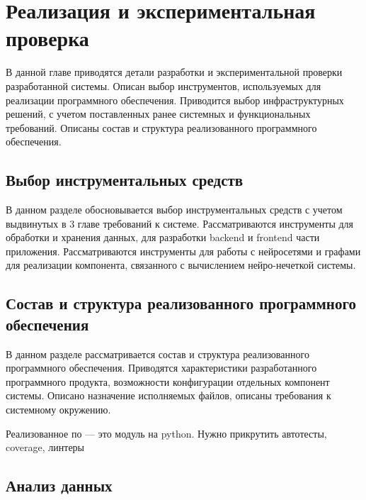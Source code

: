 \chapter{Реализация и экспериментальная проверка}

\begin{annotation}
	В данной главе приводятся детали разработки и экспериментальной проверки
	разработанной системы. Описан выбор инструментов, используемых для реализации
	программного обеспечения. Приводится выбор инфраструктурных решений,
	с учетом поставленных ранее системных и функциональных требований.
	Описаны состав и структура реализованного программного обеспечения.
\end{annotation}




\section{Выбор инструментальных средств}
\begin{annotation}
	В данном разделе обосновывается выбор инструментальных средств с учетом выдвинутых в 3
	главе требований к системе. Рассматриваются инструменты для обработки и хранения данных,
	для разработки backend и frontend части приложения. Рассматриваются инструменты для работы
	с нейросетями и графами для реализации компонента, связанного с вычислением нейро-нечеткой системы.
\end{annotation}



\section{Состав и структура реализованного программного обеспечения}
\begin{annotation}
	В данном разделе рассматривается состав и структура реализованного программного обеспечения.
	Приводятся характеристики разработанного программного продукта, возможности конфигурации отдельных
	компонент системы. Описано назначение исполняемых файлов, описаны требования к системному окружению.
\end{annotation}

Реализованное по --- это модуль на python.
Нужно прикрутить автотесты, coverage, линтеры

\section{Анализ данных}

